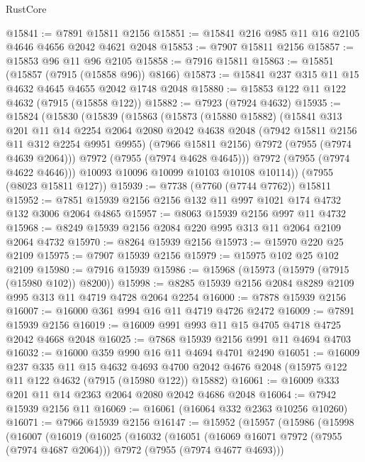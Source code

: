 \begin{lexlean}{RustCore}
\begin{coremodule}
@15841 := @7891 @15811 @2156
@15851 := @15841 @216 @985 @11 @16 @2105 @4646 @4656 @2042 @4621 @2048
@15853 := @7907 @15811 @2156
@15857 := @15853 @96 @11 @96 @2105
@15858 := @7916 @15811
@15863 := @15851 (@15857 (@7915 (@15858 @96)) @8166)
@15873 := @15841 @237 @315 @11 @15 @4632 @4645 @4655 @2042 @1748 @2048
@15880 := @15853 @122 @11 @122 @4632 (@7915 (@15858 @122))
@15882 := @7923 (@7924 @4632)
@15935 := @15824
    (@15830
      (@15839
        (@15863
          (@15873
            (@15880 @15882)
            (@15841
              @313
              @201
              @11
              @14
              @2254
              @2064
              @2080
              @2042
              @4638
              @2048
              (@7942 @15811 @2156 @11 @312 @2254 @9951 @9955)
              (@7966 @15811 @2156)
              @7972
              (@7955 (@7974 @4639 @2064)))
            @7972
            (@7955 (@7974 @4628 @4645)))
          @7972
          (@7955 (@7974 @4622 @4646)))
        @10093
        @10096
        @10099
        @10103
        @10108
        @10114))
    (@7955 (@8023 @15811 @127))
@15939 := @7738 (@7760 (@7744 @7762)) @15811
@15952 := @7851 @15939 @2156 @2156 @132 @11 @997 @1021 @174 @4732 @132 @3006 @2064 @4865
@15957 := @8063 @15939 @2156 @997 @11 @4732
@15968 := @8249 @15939 @2156 @2084 @220 @995 @313 @11 @2064 @2109 @2064 @4732
@15970 := @8264 @15939 @2156
@15973 := @15970 @220 @25 @2109
@15975 := @7907 @15939 @2156
@15979 := @15975 @102 @25 @102 @2109
@15980 := @7916 @15939
@15986 := @15968 (@15973 (@15979 (@7915 (@15980 @102)) @8200))
@15998 := @8285 @15939 @2156 @2084 @8289 @2109 @995 @313 @11 @4719 @4728 @2064 @2254
@16000 := @7878 @15939 @2156
@16007 := @16000 @361 @994 @16 @11 @4719 @4726 @2472
@16009 := @7891 @15939 @2156
@16019 := @16009 @991 @993 @11 @15 @4705 @4718 @4725 @2042 @4668 @2048
@16025 := @7868 @15939 @2156 @991 @11 @4694 @4703
@16032 := @16000 @359 @990 @16 @11 @4694 @4701 @2490
@16051 := @16009
    @237
    @335
    @11
    @15
    @4632
    @4693
    @4700
    @2042
    @4676
    @2048
    (@15975 @122 @11 @122 @4632 (@7915 (@15980 @122)) @15882)
@16061 := @16009 @333 @201 @11 @14 @2363 @2064 @2080 @2042 @4686 @2048
@16064 := @7942 @15939 @2156 @11
@16069 := @16061 (@16064 @332 @2363 @10256 @10260)
@16071 := @7966 @15939 @2156
@16147 := @15952
    (@15957
      (@15986
        (@15998
          (@16007
            (@16019
              (@16025
                (@16032
                  (@16051
                    (@16069 @16071 @7972 (@7955 (@7974 @4687 @2064)))
                    @7972
                    (@7955 (@7974 @4677 @4693)))

\end{coremodule}
\end{lexlean}
